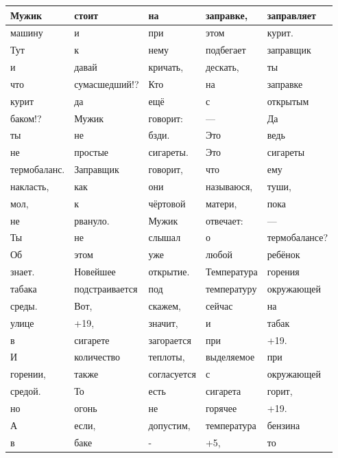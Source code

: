 \documentclass{article}
\begin{document}
\begin{center}
\hspace*{-4cm}
\begin{tabular}{ | m{10em} | m{10em} | m{10em} | m{10em} | m{10em} | }

	\hline
	Мужик & стоит & на & заправке, & заправляет \\
	\hline
	машину & и & при & этом & курит. \\
	\hline
	Тут & к & нему & подбегает & заправщик \\
	\hline
	и & давай & кричать, & дескать, & ты \\
	\hline
	что & сумасшедший!? & Кто & на & заправке \\
	\hline
	курит & да & ещё & с & открытым \\
	\hline
	баком!? & Мужик & говорит: & — & Да \\
	\hline
	ты & не & бзди. & Это & ведь \\
	\hline
	не & простые & сигареты. & Это & сигареты \\
	\hline
	термобаланс. & Заправщик & говорит, & что & ему \\
	\hline
	накласть, & как & они & называюся, & туши, \\
	\hline
	мол, & к & чёртовой & матери, & пока \\
	\hline
	не & рвануло. & Мужик & отвечает: & — \\
	\hline
	Ты & не & слышал & о & термобалансе? \\
	\hline
	Об & этом & уже & любой & ребёнок \\
	\hline
	знает. & Новейшее & открытие. & Температура & горения \\
	\hline
	табака & подстраивается & под & температуру & окружающей \\
	\hline
	среды. & Вот, & скажем, & сейчас & на \\
	\hline
	улице & +19, & значит, & и & табак \\
	\hline
	в & сигарете & загорается & при & +19. \\
	\hline
	И & количество & теплоты, & выделяемое & при \\
	\hline
	горении, & также & согласуется & с & окружающей \\
	\hline
	средой. & То & есть & сигарета & горит, \\
	\hline
	но & огонь & не & горячее & +19. \\
	\hline
	А & если, & допустим, & температура & бензина \\
	\hline
	в & баке & - & +5, & то \\

\end{tabular}
\end{center}
\end{document}
